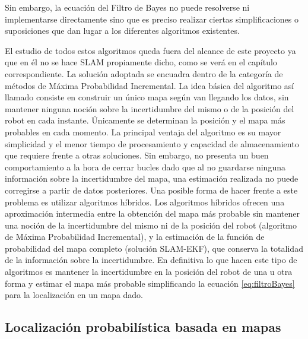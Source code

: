 Sin embargo, la ecuación del Filtro de Bayes no puede resolverse ni implementarse directamente sino que es preciso realizar ciertas simplificaciones o suposiciones que dan lugar a los diferentes algoritmos existentes.

El estudio de todos estos algoritmos queda fuera del alcance de este proyecto ya que en él no se hace SLAM propiamente dicho, como se verá en el capítulo correspondiente. La solución adoptada se encuadra dentro de la categoría de métodos de Máxima Probabilidad Incremental. La idea básica del algoritmo así llamado consiste en construir un único mapa según van llegando los datos, sin mantener ninguna noción sobre la incertidumbre del mismo o de la posición del robot en cada instante. Únicamente se determinan la posición y el mapa más probables en cada momento. La principal ventaja del algoritmo es su mayor simplicidad y el menor tiempo de procesamiento y capacidad de almacenamiento que requiere frente a otras soluciones. Sin embargo, no presenta un buen comportamiento a la hora de cerrar bucles dado que al no guardarse ninguna información sobre la incertidumbre del mapa, una estimación realizada no puede corregirse a partir de datos posteriores. Una posible forma de hacer frente a este problema es utilizar algoritmos híbridos. Los algoritmos híbridos ofrecen una aproximación intermedia entre la obtención del mapa más probable sin mantener una noción de la incertidumbre del mismo ni de la posición del robot (algoritmo de Máxima Probabilidad Incremental), y la estimación de la función de probabilidad del mapa completo (solución SLAM-EKF), que conserva la totalidad de la información sobre la incertidumbre. En definitiva lo que hacen este tipo de algoritmos es mantener la incertidumbre en la posición del robot de una u otra forma y estimar el mapa más probable simplificando la ecuación \ref{eq:filtroBayes} para la localización en un mapa dado.



\subsection {Localización probabilística basada en mapas}

